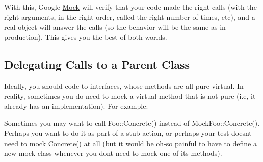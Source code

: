 With this, Google \mbox{\hyperlink{class_mock}{Mock}} will verify that your code made the right calls (with the right arguments, in the right order, called the right number of times, etc), and a real object will answer the calls (so the behavior will be the same as in production). This gives you the best of both worlds.

\subsection*{Delegating Calls to a Parent Class}

Ideally, you should code to interfaces, whose methods are all pure virtual. In reality, sometimes you do need to mock a virtual method that is not pure (i.\+e, it already has an implementation). For example\+:


\begin{DoxyCode}{0}
\DoxyCodeLine{ \textcolor{keyword}{public}:}
\DoxyCodeLine{}
\DoxyCodeLine{\};}
\DoxyCodeLine{}
\DoxyCodeLine{ \textcolor{keyword}{public}:}
\DoxyCodeLine{  \textcolor{comment}{// Mocking a pure method.}}
\DoxyCodeLine{  \textcolor{comment}{// Mocking a concrete method.  Foo::Concrete() is shadowed.}}
\DoxyCodeLine{\};}
\end{DoxyCode}


Sometimes you may want to call {\ttfamily Foo\+::\+Concrete()} instead of {\ttfamily Mock\+Foo\+::\+Concrete()}. Perhaps you want to do it as part of a stub action, or perhaps your test doesn\textquotesingle{}t need to mock {\ttfamily Concrete()} at all (but it would be oh-\/so painful to have to define a new mock class whenever you don\textquotesingle{}t need to mock one of its methods).

